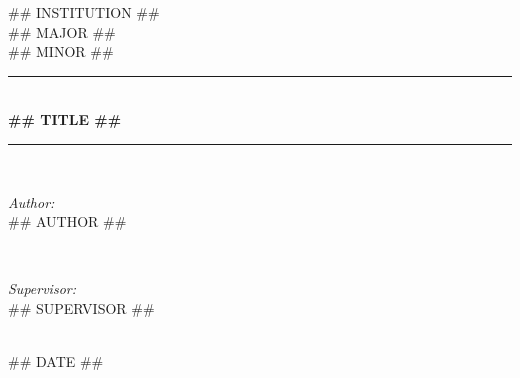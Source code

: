 \begin{titlepage}

\newcommand{\HRule}{\rule{\linewidth}{0.5mm}}

\center
 
\textsc{\LARGE ## INSTITUTION ##}\\[1.5cm]
\textsc{\Large ## MAJOR ##}\\[0.5cm]
\textsc{\large ## MINOR ##}\\[0.5cm]

\HRule \\[0.4cm]
{ \huge \bfseries ## TITLE ##}\\[0.4cm]
\HRule \\[1.5cm]
 
\begin{minipage}{0.4\textwidth}
\begin{flushleft} \large
\emph{Author:}\\
## AUTHOR ##
\end{flushleft}
\end{minipage}
~
\begin{minipage}{0.4\textwidth}
\begin{flushright} \large
\emph{Supervisor:} \\
## SUPERVISOR ##
\end{flushright}
\end{minipage}\\[4cm]


{\large ## DATE ##}\\[3cm]

 
\vfill

\end{titlepage}

